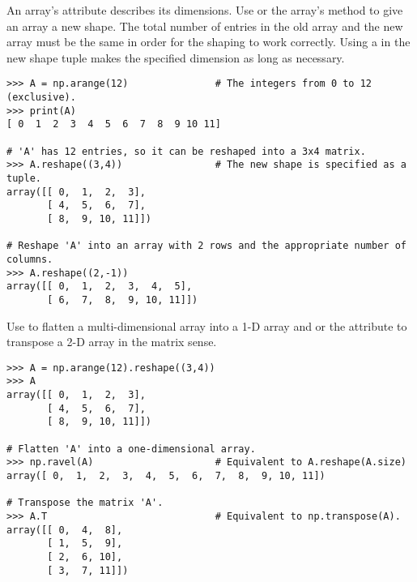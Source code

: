An array's  attribute describes its dimensions.
Use  or the array's  method to give an array a new shape.
The total number of entries in the old array and the new array must be the same in order for the shaping to work correctly.
Using a  in the new shape tuple makes the specified dimension as long as necessary.

\begin{lstlisting}
>>> A = np.arange(12)               # The integers from 0 to 12 (exclusive).
>>> print(A)
[ 0  1  2  3  4  5  6  7  8  9 10 11]

# 'A' has 12 entries, so it can be reshaped into a 3x4 matrix.
>>> A.reshape((3,4))                # The new shape is specified as a tuple.
array([[ 0,  1,  2,  3],
       [ 4,  5,  6,  7],
       [ 8,  9, 10, 11]])

# Reshape 'A' into an array with 2 rows and the appropriate number of columns.
>>> A.reshape((2,-1))
array([[ 0,  1,  2,  3,  4,  5],
       [ 6,  7,  8,  9, 10, 11]])
\end{lstlisting}

Use  to flatten a multi-dimensional array into a 1-D array and  or the  attribute to transpose a 2-D array in the matrix sense.

\begin{lstlisting}
>>> A = np.arange(12).reshape((3,4))
>>> A
array([[ 0,  1,  2,  3],
       [ 4,  5,  6,  7],
       [ 8,  9, 10, 11]])

# Flatten 'A' into a one-dimensional array.
>>> np.ravel(A)                     # Equivalent to A.reshape(A.size)
array([ 0,  1,  2,  3,  4,  5,  6,  7,  8,  9, 10, 11])

# Transpose the matrix 'A'.
>>> A.T                             # Equivalent to np.transpose(A).
array([[ 0,  4,  8],
       [ 1,  5,  9],
       [ 2,  6, 10],
       [ 3,  7, 11]])
\end{lstlisting}

